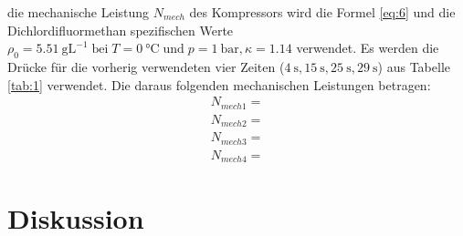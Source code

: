 \justifying die mechanische Leistung $N_{mech}$ des Kompressors wird die Formel \eqref{eq:6} und die Dichlordifluormethan spezifischen Werte 
\cite{V206} $\rho_0 = \SI{5.51}{\gram\liter\tothe{-1}}\; \text{bei}\; T = \SI{0}{\celsius}\; \text{und}\; p = \SI{1}{\bar}, \kappa = 1.14$ verwendet. Es werden die Drücke für die vorherig
verwendeten vier Zeiten ($\SI{4}{\second}, \SI{15}{\second}, \SI{25}{\second}, \SI{29}{\second}$) aus Tabelle \ref{tab:1} verwendet. Die daraus
folgenden mechanischen Leistungen betragen:
\begin{subequations}
\begin{align}
    N_{mech1} = \text{} \label{eq:18a}\\
    N_{mech2} = \text{} \label{eq:18b}\\
    N_{mech3} = \text{} \label{eq:18c}\\
    N_{mech4} = \text{} \label{eq:18d}
\end{align}
\end{subequations}




\section{Diskussion}


\newpage
\printbibliography



